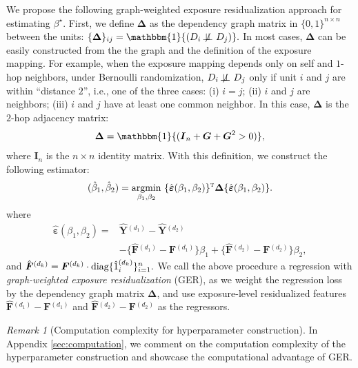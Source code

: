 \documentclass{article}
\theoremstyle{plain}
\theoremstyle{definition}
\theoremstyle{remark}
\newtheorem{remark}[theorem]{Remark}
\DeclareMathOperator*{\argmin}{argmin}
\def\T{{\textsc{t}}}
\newcommand{\bY}{\boldsymbol{Y}}
\newcommand{\bG}{\boldsymbol{G}}
\newcommand{\bF}{\boldsymbol{F}}
\newcommand{\bI}{\boldsymbol{I}}
\newcommand{\bDelta}{\boldsymbol{\Delta}}
\newcommand{\bepsilon}{\boldsymbol{\varepsilon}}
\newcommand{\indicator}{\mathbbm{1}}
\newcommand{\nonindep}{{~\not\!\perp\!\!\!\perp~}}
\begin{document}
We propose the following graph-weighted exposure residualization approach for estimating $\beta^\star$. First, we define $\bDelta$ as the dependency graph matrix in $\{0,1\}^{n\times n}$ between the units: $\{\bDelta\}_{ij} = \indicator{(D_i \nonindep D_j)}.$ 
In most cases, $\bDelta$ can be easily constructed from the the graph and the definition of the exposure mapping. For example, when the exposure mapping depends only on self and $1$-hop neighbors, under Bernoulli randomization, $D_i \nonindep D_j$ only if unit $i$ and $j$ are within ``distance $2$'', i.e., one of the three cases: (i) $i = j$; (ii) $i$ and $j$ are neighbors; (iii) $i$ and $j$ have at least one common neighbor. In this case, $\bDelta$ is the $2$-hop adjacency matrix:
\begin{align}
    \bDelta = \indicator{(\bI_n + \bG + \bG^2 > 0)},
\end{align}
where $\bI_n$ is the $n\times n$ identity matrix. 
With this definition, we construct the following estimator: 
\begin{align}\label{eq::regression}
    (\hat{\beta}_1, \hat{\beta}_2) 
    = \argmin_{\beta_1, \beta_2} ~
     \{\hat{\bepsilon}(\beta_1, \beta_2)\}^{\T} \bDelta \{\hat{\bepsilon}(\beta_1, \beta_2)\}.
\end{align}
where
\begin{align*}
    \hat{\bepsilon}(\beta_1, \beta_2) =& 
    \hat{\bY}{}^{(d_1)} - \hat{\bY}{}^{(d_2)} \\
    &- \{\hat{\bF}{}^{(d_1)} - \bF{}^{(d_1)}\} \beta_1 + \{\hat{\bF}{}^{(d_2)} - \bF{}^{(d_2)}\} \beta_2,
\end{align*}
and $\hat{\bF}{}^{(d_k)} = \bF{}^{(d_k)} \cdot \textup{diag}\{\hat 1{}_i^{(d_k)}\}_{i=1}^n.$ 
We call the above procedure a regression with \textit{graph-weighted exposure residualization} (GER), as we weight the regression loss by the dependency graph matrix $\bDelta$, and use exposure-level residualized features $\hat{\bF}{}^{(d_1)} - \bF{}^{(d_1)} $ and $\hat{\bF}{}^{(d_2)} - \bF{}^{(d_2)} $ as the regressors.


\begin{remark}[Computation complexity for hyperparameter construction]
In Appendix \ref{sec:computation}, we comment on the computation complexity of the hyperparameter construction and showcase the computational advantage of GER. 
\end{remark}
\end{document}
